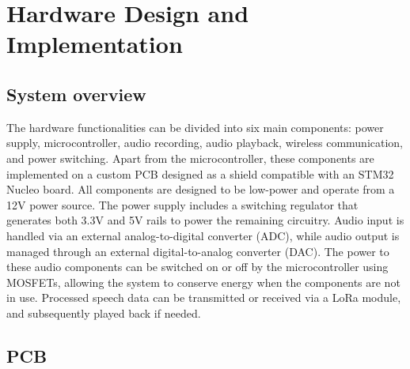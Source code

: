 \section{Hardware Design and Implementation}

\subsection{System overview}

The hardware functionalities can be divided into six main components: power supply, microcontroller, audio recording, audio playback, wireless communication, and power switching.
Apart from the microcontroller, these components are implemented on a custom PCB designed as a shield compatible with an STM32 Nucleo board.
All components are designed to be low-power and operate from a 12V power source.
The power supply includes a switching regulator that generates both 3.3V and 5V rails to power the remaining circuitry.
Audio input is handled via an external analog-to-digital converter (ADC), while audio output is managed through an external digital-to-analog converter (DAC).
The power to these audio components can be switched on or off by the microcontroller using MOSFETs, allowing the system to conserve energy when the components are not in use.
Processed speech data can be transmitted or received via a LoRa module, and subsequently played back if needed.

\subsection{PCB}

